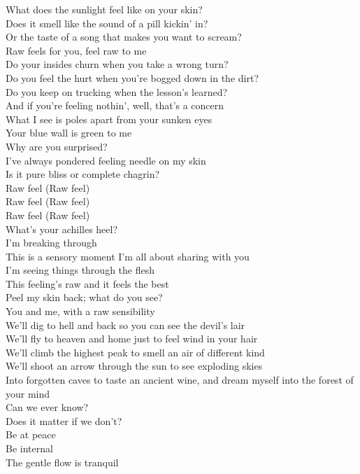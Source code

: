 What does the sunlight feel like on your skin?\\
Does it smell like the sound of a pill kickin' in?\\
Or the taste of a song that makes you want to scream?\\
Raw feels for you, feel raw to me\\

Do your insides churn when you take a wrong turn?\\
Do you feel the hurt when you're bogged down in the dirt?\\
Do you keep on trucking when the lesson's learned?\\
And if you're feeling nothin', well, that's a concern\\

What I see is poles apart from your sunken eyes\\
Your blue wall is green to me\\
Why are you surprised?\\
I've always pondered feeling needle on my skin\\
Is it pure bliss or complete chagrin?\\

Raw feel (Raw feel)\\
Raw feel (Raw feel)\\
Raw feel (Raw feel)\\
What's your achilles heel?\\

I'm breaking through\\
This is a sensory moment I'm all about sharing with you\\
I'm seeing things through the flesh\\
This feeling's raw and it feels the best\\
Peel my skin back; what do you see?\\
You and me, with a raw sensibility\\

We'll dig to hell and back so you can see the devil's lair\\
We'll fly to heaven and home just to feel wind in your hair\\
We'll climb the highest peak to smell an air of different kind\\
We'll shoot an arrow through the sun to see exploding skies\\
Into forgotten caves to taste an ancient wine, and dream myself into the forest of your mind\\
Can we ever know?\\
Does it matter if we don't?\\
Be at peace\\
Be internal\\
The gentle flow is tranquil\\

